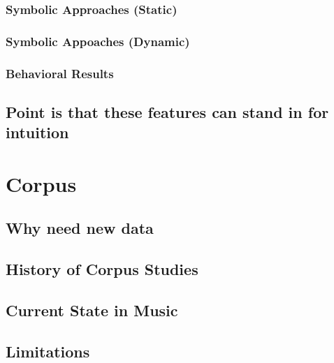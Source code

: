 \documentclass[]{book}
\theoremstyle{definition}
\theoremstyle{definition}
\theoremstyle{definition}
\theoremstyle{remark}
\begin{document}
\hypertarget{symbolic-approaches-static}{%
\subsection{Symbolic Approaches
(Static)}\label{symbolic-approaches-static}}

\hypertarget{symbolic-appoaches-dynamic}{%
\subsection{Symbolic Appoaches
(Dynamic)}\label{symbolic-appoaches-dynamic}}

\hypertarget{behavioral-results}{%
\subsection{Behavioral Results}\label{behavioral-results}}

\hypertarget{point-is-that-these-features-can-stand-in-for-intuition}{%
\section{Point is that these features can stand in for
intuition}\label{point-is-that-these-features-can-stand-in-for-intuition}}

\hypertarget{corpus}{%
\chapter{Corpus}\label{corpus}}

\hypertarget{why-need-new-data}{%
\section{Why need new data}\label{why-need-new-data}}

\hypertarget{history-of-corpus-studies}{%
\section{History of Corpus Studies}\label{history-of-corpus-studies}}

\hypertarget{current-state-in-music}{%
\section{Current State in Music}\label{current-state-in-music}}

\hypertarget{limitations}{%
\section{Limitations}\label{limitations}}
\end{document}
